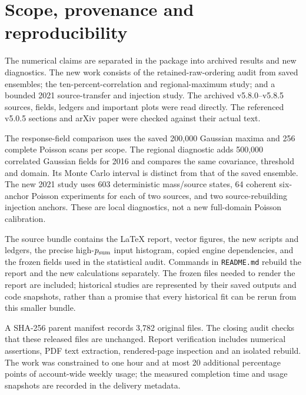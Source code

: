 \section{Scope, provenance and reproducibility}
The numerical claims are separated in the package into archived results and new diagnostics. The new work consists of the retained-raw-ordering audit from saved ensembles; the ten-percent-correlation and regional-maximum study; and a bounded 2021 source-transfer and injection study. The archived v5.8.0--v5.8.5 sources, fields, ledgers and important plots were read directly. The referenced v5.0.5 sections and arXiv paper were checked against their actual text.

The response-field comparison uses the saved 200,000 Gaussian maxima and 256 complete Poisson scans per scope. The regional diagnostic adds 500,000 correlated Gaussian fields for 2016 and compares the same covariance, threshold and domain. Its Monte Carlo interval is distinct from that of the saved ensemble. The new 2021 study uses 603 deterministic mass/source states, 64 coherent six-anchor Poisson experiments for each of two sources, and two source-rebuilding injection anchors. These are local diagnostics, not a new full-domain Poisson calibration.

The source bundle contains the LaTeX report, vector figures, the new scripts and ledgers, the precise high-$p_{\rm sum}$ input histogram, copied engine dependencies, and the frozen fields used in the statistical audit. Commands in \texttt{README.md} rebuild the report and the new calculations separately. The frozen files needed to render the report are included; historical studies are represented by their saved outputs and code snapshots, rather than a promise that every historical fit can be rerun from this smaller bundle.

A SHA-256 parent manifest records 3,782 original files. The closing audit checks that these released files are unchanged. Report verification includes numerical assertions, PDF text extraction, rendered-page inspection and an isolated rebuild. The work was constrained to one hour and at most 20 additional percentage points of account-wide weekly usage; the measured completion time and usage snapshots are recorded in the delivery metadata.
